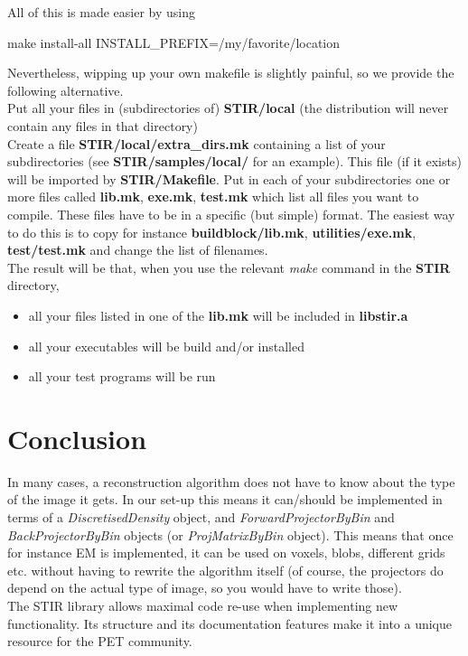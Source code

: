 \documentclass{article}
\begin{document}
All of this is made easier by using 


{\small make install-all INSTALL\_PREFIX=/my/favorite/location}


Nevertheless, wipping up your own makefile is slightly painful, 
so we provide the following alternative. \\
Put all your files in (subdirectories of) \textbf{STIR/local} (the distribution 
will never contain any files in that directory)\\
Create a file \textbf{STIR/local/extra\_dirs.mk} containing a list 
of your subdirectories (see \textbf{STIR/samples/local/} for an example). 
This file (if it exists) will be imported by \textbf{STIR/Makefile}. 
Put in each of your subdirectories one or more files called \textbf{lib.mk}, \textbf{exe.mk}, \textbf{test.mk} 
which list all files you want to compile. These files have to 
be in a specific (but simple) format. The easiest way to do this 
is to copy for instance \textbf{buildblock/lib.mk}, \textbf{utilities/exe.mk}, \textbf{test/test.mk} 
and change the list of filenames. \\
The result will be that, when you use the relevant \textit{make} command 
in the \textbf{STIR} directory,
\begin{itemize}
\item 
all your files listed in one of the \textbf{lib.mk} will be included 
in \textbf{libstir.a}
\item 
all your executables will be build and/or installed
\item 
all your test programs will be run
\end{itemize}



\section{
Conclusion}

In many cases, a reconstruction algorithm does not have to know 
about the type of the image it gets. In our set-up this means 
it can/should be implemented in terms of a \textit{DiscretisedDensity} 
object, and \textit{ForwardProjectorByBin} and \textit{BackProjectorByBin} 
objects (or \textit{ProjMatrixByBin} object). This means that once 
for instance EM is implemented, it can be used on voxels, blobs, 
different grids etc. without having to rewrite the algorithm 
itself (of course, the projectors do depend on the actual type 
of image, so you would have to write those).\\
The STIR library allows maximal code re-use when implementing 
new functionality. Its structure and its documentation features 
make it into a unique resource for the PET community. 
\end{document}
